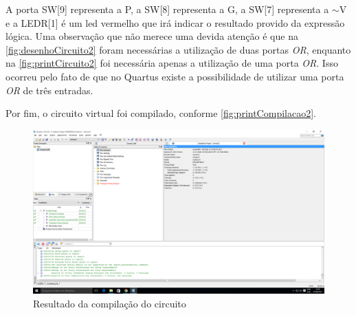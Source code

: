 	A porta SW[9] representa a P, a SW[8] representa a G, a SW[7]
	 representa a $\sim$V e a LEDR[1] é um led vermelho que irá
	 indicar o resultado provido da expressão lógica. Uma observação que não merece uma devida atenção é que
	 na \autoref{fig:desenhoCircuito2} foram necessárias a utilização de duas portas \textit{OR}, enquanto na
	 \autoref{fig:printCircuito2} foi necessária apenas a utilização de uma porta \textit{OR}. Isso ocorreu pelo fato
	 de que no Quartus existe a possibilidade de utilizar uma porta \textit{OR} de três entradas.

	Por fim, o circuito virtual foi compilado, conforme \autoref{fig:printCompilacao2}.

	\begin{figure}[H]
	    \centering
		\caption{\label{fig:printCompilacao2}Resultado da compilação do circuito}
		\includegraphics[width=1\textwidth]{img/cenario2/printCompilacao}
	\end{figure}


